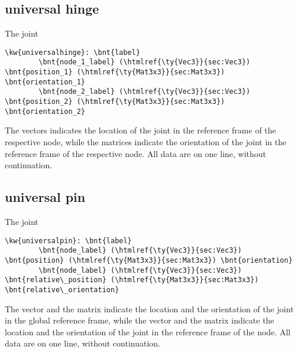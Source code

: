 \subsection{universal hinge}
The  joint
\begin{Verbatim}[commandchars=\\\{\}]
    \kw{universalhinge}: \bnt{label}
        \bnt{node_1_label} (\htmlref{\ty{Vec3}}{sec:Vec3}) \bnt{position_1} (\htmlref{\ty{Mat3x3}}{sec:Mat3x3}) \bnt{orientation_1}
        \bnt{node_2_label} (\htmlref{\ty{Vec3}}{sec:Vec3}) \bnt{position_2} (\htmlref{\ty{Mat3x3}}{sec:Mat3x3}) \bnt{orientation_2}
\end{Verbatim}
The  vectors indicates the location of the joint
in the reference frame of the respective node,
while the  matrices indicate the orientation of the joint
in the reference frame of the respective node.
All data are on one line, without continuation.

\subsection{universal pin}
The  joint
\begin{Verbatim}[commandchars=\\\{\}]
    \kw{universalpin}: \bnt{label}
        \bnt{node_label} (\htmlref{\ty{Vec3}}{sec:Vec3}) \bnt{position} (\htmlref{\ty{Mat3x3}}{sec:Mat3x3}) \bnt{orientation}
        \bnt{node_label} (\htmlref{\ty{Vec3}}{sec:Vec3}) \bnt{relative\_position} (\htmlref{\ty{Mat3x3}}{sec:Mat3x3}) \bnt{relative\_orientation}
\end{Verbatim}
The  vector and the  matrix indicate 
the location and the orientation of the joint in the global reference frame, 
while the  vector
and the  matrix indicate
the location and the orientation of the joint
in the reference frame of the node.
All data are on one line, without continuation.

